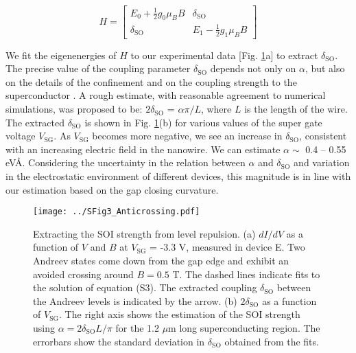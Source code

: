 \begin{equation}
H = \begin{bmatrix}
E_0 + \frac{1}{2}g_0 \mu_B B & \delta_{\mathrm{SO}} \\
\delta_{\mathrm{SO}} & E_1 - \frac{1}{2}g_1 \mu_B B
\end{bmatrix}
\end{equation}

We fit the eigenenergies of $H$ to our experimental data [Fig. \ref{fig:SOIlevelrep}a] to extract $\delta_{\mathrm{SO}}$. The precise value of the coupling parameter $\delta_{\mathrm{SO}}$ depends not only on $\alpha$, but also on the details of the confinement and on the coupling strength to the superconductor \cite{DeMoor2018}. A rough estimate, with reasonable agreement to numerical simulations, was proposed to be: $2\delta_{\mathrm{SO}}$ = $\alpha \pi/ L$, where $L$ is the length of the wire. The extracted $\delta_{\mathrm{SO}}$ is shown in Fig. \ref{fig:SOIlevelrep}(b) for various values of the super gate voltage $V_{\mathrm{SG}}$. As $V_{\mathrm{SG}}$ becomes more negative, we see an increase in $\delta_{\mathrm{SO}}$, consistent with an increasing electric field in the nanowire. We can estimate $\alpha \sim$ 0.4 -- 0.55 eV\AA. Considering the uncertainty in the relation between $\alpha$ and $\delta_{\mathrm{SO}}$ and variation in the electrostatic environment of different devices, this magnitude is in line with our estimation based on the gap closing curvature.

\begin{figure}[h]
\texttt{[image: ../SFig3\_Anticrossing.pdf]}
\caption{\label{fig:SOIlevelrep}
    Extracting the SOI strength from level repulsion. 
    (a) $dI/dV$ as a function of $V$ and $B$ at $V_{\mathrm{SG}}$ = -3.3 V, measured in device E. Two Andreev states come down from the gap edge and exhibit an avoided crossing around $B = 0.5$ T. The dashed lines indicate fits to the solution of equation (S3). The extracted coupling $\delta_{\mathrm{SO}}$ between the Andreev levels is indicated by the arrow. (b) $2\delta_{\mathrm{SO}}$ as a function of $V_{\mathrm{SG}}$. The right axis shows the estimation of the SOI strength using $\alpha = 2\delta_{\mathrm{SO}}L/\pi$ for the 1.2 $\mu$m long superconducting region. The errorbars show the standard deviation in $\delta_{\mathrm{SO}}$ obtained from the fits.
}
\end{figure}

\clearpage
